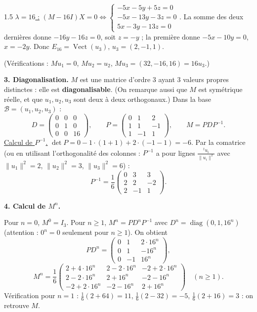 \documentclass[12pt]{article}
\begin{document}
\begin{spacing}{1.5}
\underline{$\lambda=16$ :} $(M-16I)X=0\iff\begin{cases}-5x-5y+5z=0\\-5x-13y-3z=0\\5x-3y-13z=0\end{cases}$. La somme des deux dernières donne $-16y-16z=0$, soit $z=-y$ ; la première donne $-5x-10y=0$, $x=-2y$. Donc $E_{16}=\operatorname{Vect}(u_3)$, $u_3=(2,-1,1)$.

(Vérifications : $Mu_1=0$, $Mu_2=u_2$, $Mu_3=(32,-16,16)=16u_3$.)

\textbf{3. Diagonalisation.} $M$ est une matrice d'ordre 3 ayant 3 valeurs propres distinctes : elle est \textbf{diagonalisable}. (On remarque aussi que $M$ est symétrique réelle, et que $u_1,u_2,u_3$ sont deux à deux orthogonaux.) Dans la base $\mathcal{B}=(u_1,u_2,u_3)$ :
\[
D=\begin{pmatrix}0&0&0\\0&1&0\\0&0&16\end{pmatrix},\qquad P=\begin{pmatrix}0&1&2\\1&1&-1\\1&-1&1\end{pmatrix},\qquad M=PDP^{-1}.
\]
\underline{Calcul de $P^{-1}$.} $\det P=0-1\cdot(1+1)+2\cdot(-1-1)=-6$. Par la comatrice (ou en utilisant l'orthogonalité des colonnes : $P^{-1}$ a pour lignes $\frac{{}^tu_i}{\|u_i\|^2}$ avec $\|u_1\|^2=2$, $\|u_2\|^2=3$, $\|u_3\|^2=6$) :
\[
P^{-1}=\frac16\begin{pmatrix}0&3&3\\2&2&-2\\2&-1&1\end{pmatrix}.
\]

\textbf{4. Calcul de $M^n$.}

Pour $n=0$, $M^0=I_3$. Pour $n\ge1$, $M^n=PD^nP^{-1}$ avec $D^n=\operatorname{diag}(0,1,16^n)$ (attention : $0^n=0$ seulement pour $n\ge1$). On obtient
\[
PD^n=\begin{pmatrix}0&1&2\cdot16^n\\0&1&-16^n\\0&-1&16^n\end{pmatrix},
\]
\[
\boxed{M^n=\frac16\begin{pmatrix}2+4\cdot16^n&2-2\cdot16^n&-2+2\cdot16^n\\2-2\cdot16^n&2+16^n&-2-16^n\\-2+2\cdot16^n&-2-16^n&2+16^n\end{pmatrix}}\quad(n\ge1).
\]
Vérification pour $n=1$ : $\frac16(2+64)=11$, $\frac16(2-32)=-5$, $\frac16(2+16)=3$ : on retrouve $M$.


\end{spacing}
\end{document}

